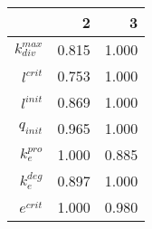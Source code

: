 \begin{tabular}{r| r r }
&2 &3 \\
\hline 
$k_{div}^{max}$& 0.815 & 1.000 \\
$l^{crit}$& 0.753 & 1.000 \\
$l^{init}$& 0.869 & 1.000 \\
$q_{init}$& 0.965 & 1.000 \\
$k_{e}^{pro}$& 1.000 & 0.885 \\
$k_{e}^{deg}$& 0.897 & 1.000 \\
$e^{crit}$& 1.000 & 0.980 \\
\end{tabular}
